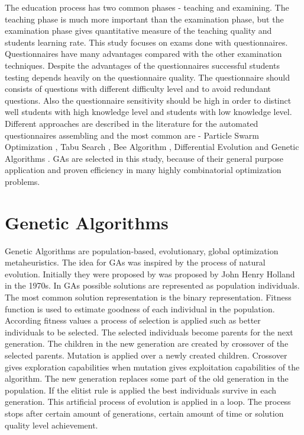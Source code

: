 \documentclass{llncs}
\begin{document}
The education process has two common phases - teaching and examining. The teaching phase is much more important than the examination phase, but the examination phase gives quantitative measure of the teaching quality and students learning rate. This study focuses on exams done with questionnaires. Questionnaires have many advantages compared with the other examination techniques. Despite the advantages of the questionnaires successful students testing depends heavily on the questionnaire quality. The questionnaire should consists of questions with different difficulty level and to avoid redundant questions. Also the questionnaire sensitivity should be high in order to distinct well students with high knowledge level and students with low knowledge level. Different approaches are described in the literature for the automated questionnaires assembling and the most common are - Particle Swarm Optimization \cite{cheng01}, Tabu Search \cite{hwang01}, Bee Algorithm \cite{luantangsrisuk01}, Differential Evolution \cite{wang01} and Genetic Algorithms \cite{gu01,verschoor01}. GAs are selected in this study, because of their general purpose application and proven efficiency in many highly combinatorial optimization problems. 

\section{Genetic Algorithms}

Genetic Algorithms are population-based, evolutionary, global optimization metaheuristics. The idea for GAs was inspired by the process of natural evolution. Initially they were proposed by was proposed by John Henry Holland in the 1970s. In GAs possible solutions are represented as population individuals. The most common solution representation is the binary representation. Fitness function is used to estimate goodness of each individual in the population. According fitness values a process of selection is applied such as better individuals to be selected. The selected individuals become parents for the next generation. The children in the new generation are created by crossover of the selected parents. Mutation is applied over a newly created children. Crossover gives exploration capabilities when mutation gives exploitation capabilities of the algorithm. The new generation replaces some part of the old generation in the population. If the elitist rule is applied the best individuals survive in each generation. This artificial process of evolution is applied in a loop. The process stops after certain amount of generations, certain amount of time or solution quality level achievement. 
\end{document}
